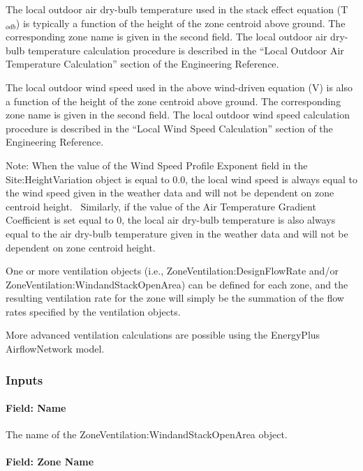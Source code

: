 The local outdoor air dry-bulb temperature used in the stack effect equation (T\(_{odb}\)) is typically a function of the height of the zone centroid above ground. The corresponding zone name is given in the second field. The local outdoor air dry-bulb temperature calculation procedure is described in the ``Local Outdoor Air Temperature Calculation'' section of the Engineering Reference.

The local outdoor wind speed used in the above wind-driven equation (V) is also a function of the height of the zone centroid above ground. The corresponding zone name is given in the second field. The local outdoor wind speed calculation procedure is described in the ``Local Wind Speed Calculation'' section of the Engineering Reference.

Note: When the value of the Wind Speed Profile Exponent field in the Site:HeightVariation object is equal to 0.0, the local wind speed is always equal to the wind speed given in the weather data and will not be dependent on zone centroid height.~ Similarly, if the value of the Air Temperature Gradient Coefficient is set equal to 0, the local air dry-bulb temperature is also always equal to the air dry-bulb temperature given in the weather data and will not be dependent on zone centroid height.

One or more ventilation objects (i.e., ZoneVentilation:DesignFlowRate and/or ZoneVentilation:WindandStackOpenArea) can be defined for each zone, and the resulting ventilation rate for the zone will simply be the summation of the flow rates specified by the ventilation objects.

More advanced ventilation calculations are possible using the EnergyPlus AirflowNetwork model.

\subsubsection{Inputs}\label{inputs-3-004}

\paragraph{Field: Name}\label{field-name-3-004}

The name of the ZoneVentilation:WindandStackOpenArea object.

\paragraph{Field: Zone Name}\label{field-zone-name-2016-06-16}

